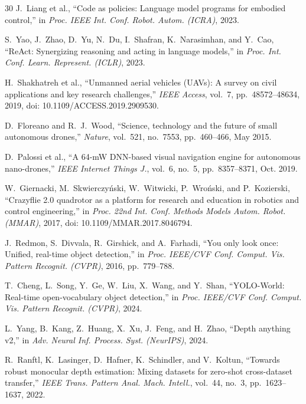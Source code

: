\documentclass[journal]{IEEEtran}
\begin{document}
\begin{thebibliography}{30}
J.~Liang et al.,
``Code as policies: Language model programs for embodied control,''
in \emph{Proc. IEEE Int. Conf. Robot. Autom. (ICRA)}, 2023.

S.~Yao, J.~Zhao, D.~Yu, N.~Du, I.~Shafran, K.~Narasimhan, and Y.~Cao,
``ReAct: Synergizing reasoning and acting in language models,''
in \emph{Proc. Int. Conf. Learn. Represent. (ICLR)}, 2023.

H.~Shakhatreh et al.,
``Unmanned aerial vehicles (UAVs): A survey on civil applications and key
research challenges,''
\emph{IEEE Access}, vol.~7, pp.~48572--48634, 2019,
doi: 10.1109/ACCESS.2019.2909530.

D.~Floreano and R.~J.~Wood,
``Science, technology and the future of small autonomous drones,''
\emph{Nature}, vol.~521, no.~7553, pp.~460--466, May 2015.

D.~Palossi et al.,
``A 64-mW DNN-based visual navigation engine for autonomous nano-drones,''
\emph{IEEE Internet Things J.}, vol.~6, no.~5, pp.~8357--8371, Oct. 2019.

W.~Giernacki, M.~Skwierczyński, W.~Witwicki, P.~Wroński, and P.~Kozierski,
``Crazyflie 2.0 quadrotor as a platform for research and education in robotics
and control engineering,''
in \emph{Proc. 22nd Int. Conf. Methods Models Autom. Robot. (MMAR)}, 2017,
doi: 10.1109/MMAR.2017.8046794.

J.~Redmon, S.~Divvala, R.~Girshick, and A.~Farhadi,
``You only look once: Unified, real-time object detection,''
in \emph{Proc. IEEE/CVF Conf. Comput. Vis. Pattern Recognit. (CVPR)},
2016, pp.~779--788.

T.~Cheng, L.~Song, Y.~Ge, W.~Liu, X.~Wang, and Y.~Shan,
``YOLO-World: Real-time open-vocabulary object detection,''
in \emph{Proc. IEEE/CVF Conf. Comput. Vis. Pattern Recognit. (CVPR)}, 2024.

L.~Yang, B.~Kang, Z.~Huang, X.~Xu, J.~Feng, and H.~Zhao,
``Depth anything v2,''
in \emph{Adv. Neural Inf. Process. Syst. (NeurIPS)}, 2024.

R.~Ranftl, K.~Lasinger, D.~Hafner, K.~Schindler, and V.~Koltun,
``Towards robust monocular depth estimation: Mixing datasets for
zero-shot cross-dataset transfer,''
\emph{IEEE Trans. Pattern Anal. Mach. Intell.}, vol.~44, no.~3,
pp.~1623--1637, 2022.


\end{thebibliography}
\end{document}
